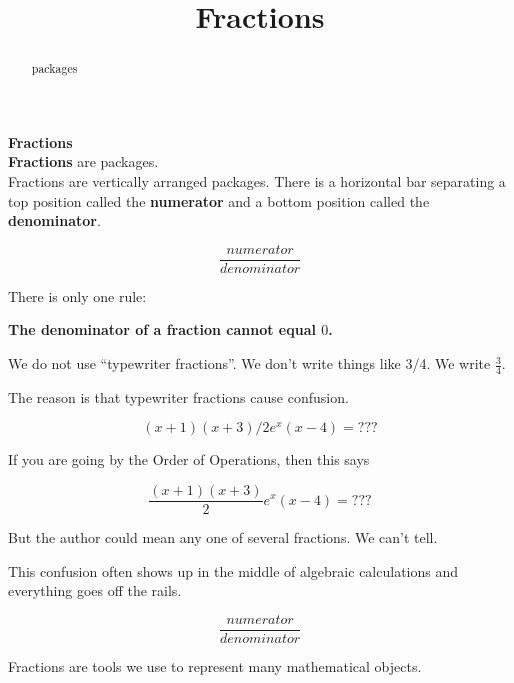 \documentclass{ximera}
\title{Fractions}
\begin{document}
\begin{abstract}
packages
\end{abstract}
\maketitle



\begin{definition}  \textbf{\textcolor{green!50!black}{Fractions}} \\


\textbf{Fractions} are packages. \\


Fractions are vertically arranged packages.  There is a horizontal bar separating a top position called the \textbf{numerator} and a bottom position called the \textbf{denominator}.



\[
\frac{numerator}{denominator}
\]


There is only one rule:

\begin{center}
\textbf{\textcolor{red!70!black}{The denominator of a fraction cannot equal $0$.}}
\end{center}


\end{definition}




\begin{warning}

We do not use ``typewriter fractions''.  We don't write things like 3/4.  We write $\frac{3}{4}$.


The reason is that typewriter fractions cause confusion.

\[
(x+1)(x+3)/2 e^x (x-4) = ???
\]


If you are going by the Order of Operations, then this says


\[
\frac{(x+1)(x+3)}{2} e^x (x-4) = ???
\]


But the author could mean any one of several fractions.  We can't tell.


This confusion often shows up in the middle of algebraic calculations and everything goes off the rails.




\[
\frac{numerator}{denominator}
\]


\end{warning}


Fractions are tools we use to represent many mathematical objects.
\end{document}
